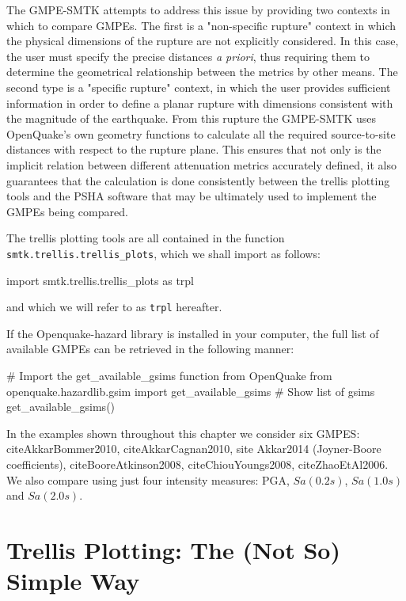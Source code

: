 The GMPE-SMTK attempts to address this issue by providing two contexts in which to compare GMPEs. The first is a "non-specific rupture" context in which the physical dimensions of the rupture are not explicitly considered. In this case, the user must specify the precise distances \emph{a priori}, thus requiring them to determine the geometrical relationship between the metrics by other means. The second type is a "specific rupture" context, in which the user provides sufficient information in order to define a planar rupture with dimensions consistent with the magnitude of the earthquake. From this rupture the GMPE-SMTK uses OpenQuake's own geometry functions to calculate all the required source-to-site distances with respect to the rupture plane. This ensures that not only is the implicit relation between different attenuation metrics accurately defined, it also guarantees that the calculation is done consistently between the trellis plotting tools and the PSHA software that may be ultimately used to implement the GMPEs being compared.

The trellis plotting tools are all contained in the function \verb=smtk.trellis.trellis_plots=, which we shall import as follows:

\begin{python}
import smtk.trellis.trellis_plots as trpl
\end{python}

\noindent and which we will refer to as \verb=trpl= hereafter.

If the Openquake-hazard library is installed in your computer, the full list of available GMPEs can be retrieved in the following manner:
\begin{python}[frame=single]
# Import the get_available_gsims function from OpenQuake
from openquake.hazardlib.gsim import get_available_gsims
# Show list of gsims
get_available_gsims()
\end{python}

In the examples shown throughout this chapter we consider six GMPES: citeAkkarBommer2010, citeAkkarCagnan2010, site Akkar2014 (Joyner-Boore coefficients), citeBooreAtkinson2008, citeChiouYoungs2008, citeZhaoEtAl2006. We also compare using just four intensity measures: PGA, $Sa \left( {0.2s} \right)$, $Sa \left( {1.0s} \right)$ and $Sa \left( {2.0s} \right)$.


\section{Trellis Plotting: The (Not So) Simple Way}
\label{sec:basic_trellis}

